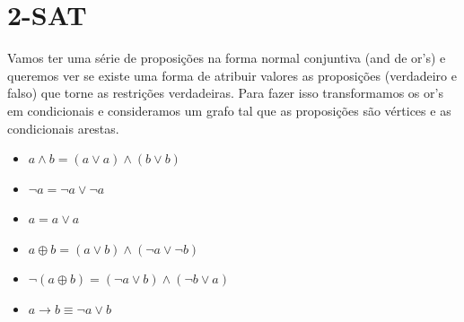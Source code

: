     \section{2-SAT}
    Vamos ter uma série de proposições na forma normal conjuntiva (and de or's) e queremos ver se existe uma forma de atribuir valores as proposições (verdadeiro e falso) que torne as restrições verdadeiras. Para fazer isso transformamos os or's em condicionais e consideramos um grafo tal que as proposições são vértices e as condicionais arestas.
    \begin{itemize}
        \item $ a \land b = (a \lor a) \land (b \lor b)$
        \item $ \neg a = \neg a \lor \neg a$
        \item $ a = a \lor a$
        \item $ a \oplus b = (a \lor b) \land (\neg a \lor \neg b)$
        \item $ \neg (a \oplus b) = (\neg a \lor b) \land (\neg b \lor a)$
        \item $ a \rightarrow b \equiv \neg a \lor b$
    \end{itemize}
    
